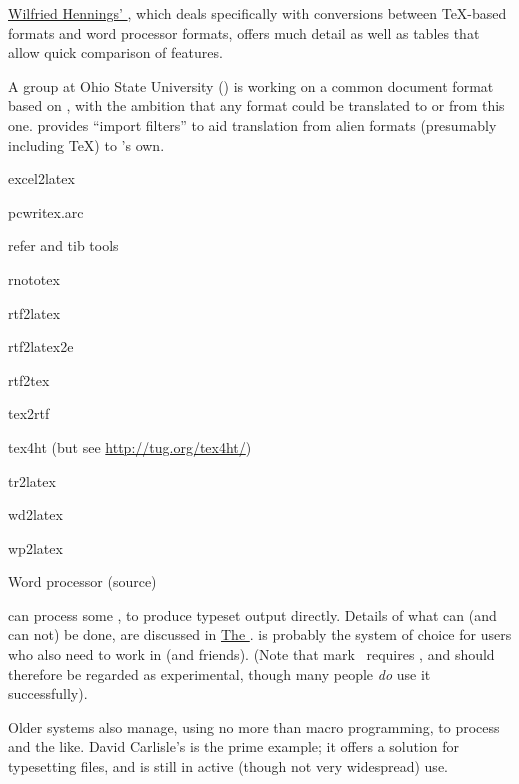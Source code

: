 \href{http://www.tug.org/utilities/texconv/index.html}{Wilfried Hennings' },
which deals specifically with conversions between \TeX{}-based formats
and word processor formats, offers much detail as well as tables that
allow quick comparison of features.

A group at Ohio State University () is working on
a common document format based on , with the ambition that any
format could be
translated to or from this one.   provides
``import filters'' to aid translation from alien formats
(presumably including \TeX{}) to 's own.
\begin{ctanrefs}
\item[excel2latex]
\item[pcwritex.arc]
\item[refer and tib tools]
\item[rnototex]
\item[rtf2latex]
\item[rtf2latex2e]
\item[rtf2tex]
\item[tex2rtf]
\item[tex4ht] (but see \url{http://tug.org/tex4ht/})
\item[tr2latex]
\item[wd2latex]
\item[wp2latex]
\item[\nothtml{\rmfamily}Word processor \acro{FAQ} (source)]%
\end{ctanrefs}


 can process some
, to produce typeset output directly.  Details of what can
(and can not) be done, are discussed in %
\href{http://wiki.contextgarden.net/XML}{The \context{} }.
\context{} is probably the system of choice for \alltex{} users who
also need to work in  (and friends).  (Note that \context{}
mark~ requires , and should
therefore be regarded as experimental, though many people \emph{do}
use it successfully).

Older systems also manage, using no more than \alltex{} macro
programming, to process  and the like.  David Carlisle's
 is the prime example; it offers a solution
for typesetting  files, and is still in active (though not
very widespread) use.

